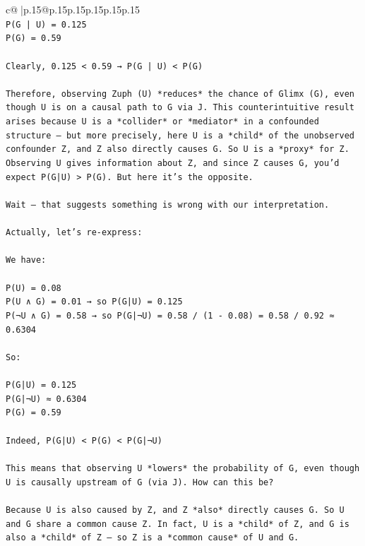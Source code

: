 \documentclass{article}
\begin{document}
{\begin{supertabular}{c@{$\;$}|p{.15\linewidth}@{}p{.15\linewidth}p{.15\linewidth}p{.15\linewidth}p{.15\linewidth}p{.15\linewidth}}
{{{\\ 
\texttt{P(G | U) = 0.125  } \\
\texttt{P(G) = 0.59} \\
\\ 
\texttt{Clearly, 0.125 < 0.59 → P(G | U) < P(G)} \\
\\ 
\texttt{Therefore, observing Zuph (U) *reduces* the chance of Glimx (G), even though U is on a causal path to G via J. This counterintuitive result arises because U is a *collider* or *mediator* in a confounded structure — but more precisely, here U is a *child* of the unobserved confounder Z, and Z also directly causes G. So U is a *proxy* for Z. Observing U gives information about Z, and since Z causes G, you’d expect P(G|U) > P(G). But here it’s the opposite.} \\
\\ 
\texttt{Wait — that suggests something is wrong with our interpretation.} \\
\\ 
\texttt{Actually, let’s re{-}express:} \\
\\ 
\texttt{We have:} \\
\\ 
\texttt{P(U) = 0.08  } \\
\texttt{P(U ∧ G) = 0.01 → so P(G|U) = 0.125  } \\
\texttt{P(¬U ∧ G) = 0.58 → so P(G|¬U) = 0.58 / (1 {-} 0.08) = 0.58 / 0.92 ≈ 0.6304} \\
\\ 
\texttt{So:} \\
\\ 
\texttt{P(G|U) = 0.125  } \\
\texttt{P(G|¬U) ≈ 0.6304  } \\
\texttt{P(G) = 0.59} \\
\\ 
\texttt{Indeed, P(G|U) < P(G) < P(G|¬U)} \\
\\ 
\texttt{This means that observing U *lowers* the probability of G, even though U is causally upstream of G (via J). How can this be?} \\
\\ 
\texttt{Because U is also caused by Z, and Z *also* directly causes G. So U and G share a common cause Z. In fact, U is a *child* of Z, and G is also a *child* of Z — so Z is a *common cause* of U and G.} \\
\\ 
}}}
\end{supertabular}}
\end{document}
